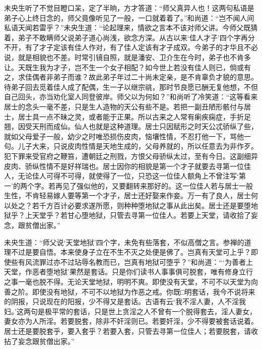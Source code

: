 \documentclass[a4paper,12pt,UTF8,twoside]{ctexbook}
\begin{document}
未央生听了不觉目瞪口呆，定了半晌，方才答道：“师父真异人也！这两句私语是弟子心上终日念的，师父竟像听见了一般，一口就着着了。”和尚道：“岂不闻人间私语天闻若雷乎？”未央生道：“论起理来，情欲之言本不该对师父讲。今师父既猜着，弟子不敢瞒师父说弟子道心尚浅，欲念方深。从古以来‘佳人才子’四个字再分不开，有了才子定该有佳人作对，有了佳人定该有才子成双。今弟子的才华且不必说，就是相貌也不差。时常引镜自照，就是潘安、卫介生在今时，弟子也不肯多让。天既生我为才子，岂不生一个女子相配？如今世上若没有佳人则已，倘或有之，求佳偶者非弟子而谁？故此弟子年过二十尚未定亲，是不肯辜负才貌的意思。待弟子回去觅着佳人成了配偶，生一子以继宗祧，那时节良愿已酬无复他想，不但自己回头，亦当劝化室人同登彼岸。师父以为何如？”和尚听了冷笑道：“这等看来居士的念头一毫不差，只是生人造物的天公有些不是。若把一副丑陋形骸付与居士，居士具一点不昧之灵，或者能于正果。所以古来之人常有瘌疾痫症，手折足翘，因受天刑而成仙。仙人也就是这种道理。居士只因赋形之时天公忒骄纵了些，就如父母爱子一般，幼少之时唯恐损伤皮肉，恼壤性情，不忍打他一下，骂他一句。儿子大来，只说皮肉性情是天地生成的，父母养就的，所以任意去为非作歹。犯下罪来受官府之鞭笞，遭朝廷之刑戮，方恨父母骄纵太过，至有今日。这副细异皮肉、骄纵性情不是好祥瑞也。居士因你的相貌是第一个才子就要去寻第一位佳人，无论佳人可得不可得，就使得了一位，只恐这一位佳人额角上不曾注写‘第一’的两个字。若再见了强似他的，又要翻转来那好的。这一位佳人若与居士一般生性，不肯轻易嫁人要等第一个才子，居士还好娶来作妾。万一有了良人，居士何以处之？若千方百计必要求遂所愿，则种种堕地狱之事从此出矣。居士还是要堕地狱乎？上天堂乎？若甘心堕地狱，只管去寻第一位佳人。若要上天堂，请收拾了妄念，跟贫僧出家。”

未央生道：“师父说‘天堂地狱’四个字，未免有些落套，不似高僧之言。参禅的道理不过是要自悟。本来使身子立在不生不灭之处便是佛了。岂真有天堂可上乎？即使些有风流罪过亦不过玷辱名教而已，岂真有地狱可堕乎？”和尚道：“‘为善者上天堂，作恶者堕地狱’果然是套话。只是你们读书人事事俱可脱套，唯有修身立行之事一毫也脱不得。无论天堂地狱，明明不爽。即使没有天堂，不可不以天堂为向善之阶。即使没有地狱，不可不以地狱为作恶之戒。你既□明套话，我今不说将来的阴报，只说现在的阳报，少不得又是套话。古语有云‘我不淫人妻，人不淫我妇。’这两句是极平常的套话，只是世上贪淫之人不曾有一个脱得套去，淫人妻女，妻女亦为人所淫。若要脱套，除非不奸淫则已。若要奸淫，少不得要被套话说着。居士还是要脱套乎，要入套乎？若要入套，只管去寻第一位佳人；若要脱套，请收拈了妄念跟贫僧出家。”
\end{document}
